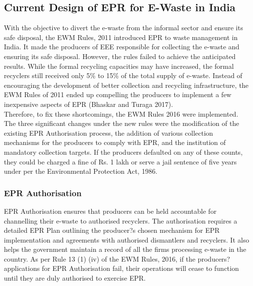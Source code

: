 \documentclass[a4paper, 12pt]{article}
\begin{document}
                    \subsection{Current Design of EPR for E-Waste in India}
                    
                    With the objective to divert the e-waste from the informal sector and ensure its safe disposal, the EWM Rules, 2011 introduced EPR to waste management in India. It made the producers of EEE responsible for collecting the e-waste and ensuring its safe disposal. 
                    However, the rules failed to achieve the anticipated results. While the formal recycling capacities may have increased, the formal recyclers still received only 5\% to 15\% of the total supply of e-waste. Instead of encouraging the development of better collection and recycling infrastructure, the EWM Rules of 2011 ended up compelling the producers to implement a few inexpensive aspects of EPR (Bhaskar and Turaga 2017). \\
                    
                    Therefore, to fix these shortcomings, the EWM Rules 2016 were implemented. The three significant changes under the new rules were the modification of the existing EPR Authorisation process, the addition of various collection mechanisms for the producers to comply with EPR, and the institution of mandatory collection targets. If the producers defaulted on any of these counts, they could be charged a fine of Rs. 1 lakh or serve a jail sentence of five years under per the Environmental Protection Act, 1986. \\
                    
                    \subsubsection{EPR Authorisation}
                    
                    EPR Authorisation ensures that producers can be held accountable for channelling their e-waste to authorised recyclers. The authorisation requires a detailed EPR Plan outlining the producer?s chosen mechanism for EPR implementation and agreements with authorised dismantlers and recyclers. It also helps the government maintain a record of all the firms processing e-waste in the country. As per Rule 13 (1) (iv) of the EWM Rules, 2016, if the producers? applications for EPR Authorisation fail, their operations will cease to function until they are duly authorised to exercise EPR.\\
                     
\end{document}
